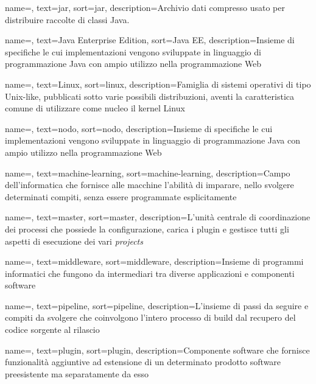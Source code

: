 {
    name=,
    text=jar,
    sort=jar,
    description={Archivio dati compresso usato per distribuire raccolte di classi Java.}
}
 
{
    name=,
    text=Java Enterprise Edition,
    sort=Java EE,
    description={Insieme di specifiche le cui implementazioni vengono sviluppate in linguaggio di programmazione Java con ampio utilizzo nella programmazione Web}
}

{
    name=,
    text=Linux,
    sort=linux,
    description={Famiglia di sistemi operativi di tipo Unix-like, pubblicati sotto varie possibili distribuzioni, aventi la caratteristica comune di utilizzare come nucleo il kernel Linux}
}

{
    name=,
    text=nodo,
    sort=nodo,
    description={Insieme di specifiche le cui implementazioni vengono sviluppate in linguaggio di programmazione Java con ampio utilizzo nella programmazione Web}
}

{
    name=,
    text=machine-learning,
    sort=machine-learning,
    description={Campo dell'informatica che fornisce alle macchine l'abilità di imparare, nello svolgere determinati compiti, senza essere programmate esplicitamente}
}

{
    name=,
    text=master,
    sort=master,
    description={L'unità centrale di coordinazione dei processi che possiede la configurazione, carica i plugin e gestisce tutti gli aspetti di esecuzione dei vari \textit{projects}}
}

{
    name=,
    text=middleware,
    sort=middleware,
    description={Insieme di programmi informatici che fungono da intermediari tra diverse applicazioni e componenti software}
}

{
    name=,
    text=pipeline,
    sort=pipeline,
    description={L'insieme di passi da seguire e compiti da svolgere che coinvolgono l'intero processo di build dal recupero del codice sorgente al rilascio}
}

{
    name=,
    text=plugin,
    sort=plugin,
    description={Componente software che fornisce funzionalità aggiuntive ad estensione di un determinato prodotto software preesistente ma separatamente da esso}
}

